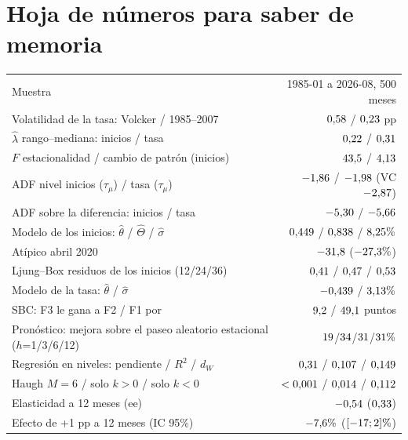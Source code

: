 \documentclass[11pt,a4paper]{article}
\begin{document}
\section{Hoja de n\'umeros para saber de memoria}\label{sec:numeros}
\begin{center}\small
\begin{tabularx}{\linewidth}{Xr}
\toprule
Muestra & 1985-01 a 2026-08, 500 meses \\
Volatilidad de la tasa: Volcker / 1985--2007 & $0{,}58$ / $0{,}23$ pp \\
$\hat\lambda$ rango--mediana: inicios / tasa & $0{,}22$ / $0{,}31$ \\
$F$ estacionalidad / cambio de patr\'on (inicios) & $43{,}5$ / $4{,}13$ \\
ADF nivel inicios ($\tau_\mu$) / tasa ($\tau_\mu$) & $-1{,}86$ / $-1{,}98$ (VC $-2{,}87$) \\
ADF sobre la diferencia: inicios / tasa & $-5{,}30$ / $-5{,}66$ \\
Modelo de los inicios: $\hat\theta$ / $\hat\Theta$ / $\hat\sigma$ & $0{,}449$ / $0{,}838$ / $8{,}25\%$ \\
At\'ipico abril 2020 & $-31{,}8$ ($-27{,}3\%$) \\
Ljung--Box residuos de los inicios (12/24/36) & $0{,}41$ / $0{,}47$ / $0{,}53$ \\
Modelo de la tasa: $\hat\theta$ / $\hat\sigma$ & $-0{,}439$ / $3{,}13\%$ \\
SBC: F3 le gana a F2 / F1 por & $9{,}2$ / $49{,}1$ puntos \\
Pron\'ostico: mejora sobre el paseo aleatorio estacional ($h$=1/3/6/12) & $19$/$34$/$31$/$31\%$ \\
Regresi\'on en niveles: pendiente / $R^2$ / $d_W$ & $0{,}31$ / $0{,}107$ / $0{,}149$ \\
Haugh $M=6$ / solo $k>0$ / solo $k<0$ & $<0{,}001$ / $0{,}014$ / $0{,}112$ \\
Elasticidad a 12 meses (ee) & $-0{,}54$ ($0{,}33$) \\
Efecto de +1 pp a 12 meses (IC 95\%) & $-7{,}6\%$ ($[-17;2]\%$) \\
\bottomrule
\end{tabularx}
\end{center}
\end{document}
